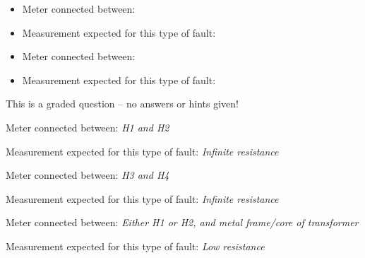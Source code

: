 \vskip 30pt

\noindent
{}

\vskip 5pt
\begin{itemize}
\item{} Meter connected between:
\vskip 5pt
\item{} Measurement expected for this type of fault:
\end{itemize}

\vskip 30pt

\noindent
{}

\vskip 5pt
\begin{itemize}
\item{} Meter connected between:
\vskip 5pt
\item{} Measurement expected for this type of fault:
\end{itemize}

\vfil 


\eject






This is a graded question -- no answers or hints given!







\noindent
{}

\vskip 5pt
\item{} Meter connected between: {\it H1 and H2}
\vskip 5pt
\item{} Measurement expected for this type of fault: {\it Infinite resistance}

\vskip 30pt

\noindent
{}

\vskip 5pt
\item{} Meter connected between: {\it H3 and H4}
\vskip 5pt
\item{} Measurement expected for this type of fault: {\it Infinite resistance}

\vskip 30pt

\noindent
{}

\vskip 5pt
\item{} Meter connected between: {\it Either H1 or H2, and metal frame/core of transformer}
\vskip 5pt
\item{} Measurement expected for this type of fault: {\it Low resistance}

